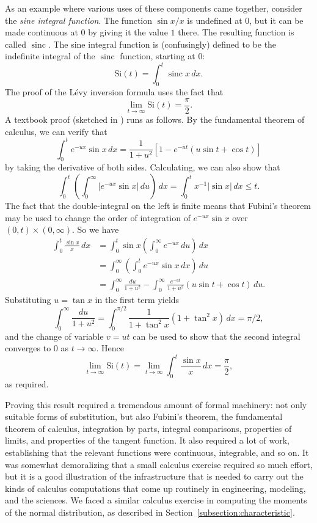 \documentclass{svjour3}
\newcommand{\fn}[1]{\mathrm{#1}} %
\newcommand{\sinc}{\mathop{\fn{sinc}}\nolimits}
\begin{document}
As an example where various uses of these components came together, consider the \emph{sine integral function}. The function $\sin x / x$ is undefined at $0$, but it can be made continuous at $0$ by giving it the value $1$ there. The resulting function is called $\sinc$. The sine integral function is (confusingly) defined to be the indefinite integral of the $\sinc$ function, starting at $0$:
\[ 
\fn{Si}(t) = \int_0^t \sinc x \, dx. 
\]
The proof of the L\'evy inversion formula uses the fact that 
\[ 
\lim_{t \rightarrow \infty} \fn{Si}(t) = \frac{\pi}{2}.
\]
A textbook proof (sketched in \cite[Example 18.4]{billingsley:95}) runs as follows. By the fundamental theorem of calculus, we can verify that
\[ 
\int_0^t e^{-ux} \sin x \, dx = \frac{1}{1+u^2}[1 - e^{-ut}(u \sin t + \cos t)] 
\]
by taking the derivative of both sides. Calculating, we can also show that
\[ 
\int_0^t \left( \int_0^\infty |e^{-ux} \sin x| \, du\right) \, dx = \int_0^t x^{-1} |\sin x| \, dx \le t.
\]
The fact that the double-integral on the left is finite means that Fubini's theorem may be used to change the order of integration of $e^{-ux} \sin x$ over $(0,t) \times (0, \infty)$. So we have
\begin{align*}
\int_0^t \frac{\sin x}{x} \, dx &= \int_0^t \sin x \left(\int_0^\infty e^{-ux} \, du\right) \, dx \\
                                &= \int_0^\infty \left(\int_0^t e^{-ux} \sin x \, dx\right) \, du \\
                                &= \int_0^\infty \frac{du}{1+u^2} - \int_0^\infty \frac{e^{-ut}}{1+u^2} (u \sin t + \cos t) \, du.
\end{align*}
Substituting $u = \tan x$ in the first term yields
\[
 \int_0^\infty \frac{du}{1+u^2} = \int_0^{\pi/2} \frac{1}{1 + \tan^2 x} (1 + \tan^2 x) \, dx = \pi/2,
\]
and the change of variable $v = ut$ can be used to show that the second integral converges to $0$ as $t \rightarrow \infty$. Hence
\[ 
\lim_{t \rightarrow \infty} \fn{Si}(t) = \lim_{t \rightarrow \infty} \int_0^t \frac{\sin x}{x} \, dx = \frac{\pi}{2},
\]
as required. 

Proving this result required a tremendous amount of formal machinery: not only suitable forms of substitution, but also Fubini's theorem, the fundamental theorem of calculus, integration by parts, integral comparisons, properties of limits, and properties of the tangent function. It also required a lot of work, establishing that the relevant functions were continuous, integrable, and so on. It was somewhat demoralizing that a small calculus exercise required so much effort, but it is a good illustration of the infrastructure that is needed to carry out the kinds of calculus computations that come up routinely in engineering, modeling, and the sciences. We faced a similar calculus exercise in computing the moments of the normal distribution, as described in Section~\ref{subsection:characteristic}.
\end{document}
